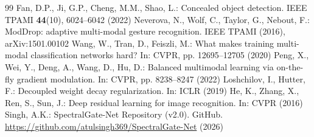 \documentclass[runningheads]{llncs}
\begin{document}
\begin{thebibliography}{99}
 Fan, D.P., Ji, G.P., Cheng, M.M., Shao, L.: Concealed object detection. IEEE TPAMI \textbf{44}(10), 6024--6042 (2022)
 Neverova, N., Wolf, C., Taylor, G., Nebout, F.: ModDrop: adaptive multi-modal gesture recognition. IEEE TPAMI (2016), arXiv:1501.00102
 Wang, W., Tran, D., Feiszli, M.: What makes training multi-modal classification networks hard? In: CVPR, pp. 12695--12705 (2020)
 Peng, X., Wei, Y., Deng, A., Wang, D., Hu, D.: Balanced multimodal learning via on-the-fly gradient modulation. In: CVPR, pp. 8238--8247 (2022)
 Loshchilov, I., Hutter, F.: Decoupled weight decay regularization. In: ICLR (2019)
 He, K., Zhang, X., Ren, S., Sun, J.: Deep residual learning for image recognition. In: CVPR (2016)
 Singh, A.K.: SpectralGate-Net Repository (v2.0). GitHub. \url{https://github.com/atulsingh369/SpectralGate-Net} (2026)
\end{thebibliography}
\end{document}
